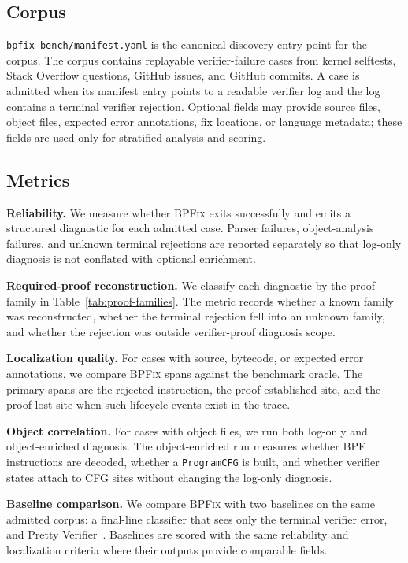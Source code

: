 \documentclass[sigplan,10pt,anonymous,review]{acmart}
\newcommand{\sys}{\textsc{BPFix}\xspace}
\begin{document}
\subsection{Corpus}
\label{sec:corpus}

\texttt{bpfix-bench/manifest.yaml} is the canonical discovery entry point for
the corpus.  The corpus contains replayable verifier-failure cases from kernel
selftests, Stack Overflow questions, GitHub issues, and GitHub commits.  A case
is admitted when its manifest entry points to a readable verifier log and the
log contains a terminal verifier rejection.  Optional fields may provide source
files, object files, expected error annotations, fix locations, or language
metadata; these fields are used only for stratified analysis and scoring.

\subsection{Metrics}
\label{sec:metrics}

\textbf{Reliability.}  We measure whether \sys exits successfully and emits a
structured diagnostic for each admitted case.  Parser failures, object-analysis
failures, and unknown terminal rejections are reported separately so that
log-only diagnosis is not conflated with optional enrichment.

\textbf{Required-proof reconstruction.}  We classify each diagnostic by the
proof family in Table~\ref{tab:proof-families}.  The metric records whether a
known family was reconstructed, whether the terminal rejection fell into an
unknown family, and whether the rejection was outside verifier-proof diagnosis
scope.

\textbf{Localization quality.}  For cases with source, bytecode, or expected
error annotations, we compare \sys spans against the benchmark oracle.  The
primary spans are the rejected instruction, the proof-established site, and the
proof-lost site when such lifecycle events exist in the trace.

\textbf{Object correlation.}  For cases with object files, we run both log-only
and object-enriched diagnosis.  The object-enriched run measures whether BPF
instructions are decoded, whether a \texttt{ProgramCFG} is built, and whether
verifier states attach to CFG sites without changing the log-only diagnosis.

\textbf{Baseline comparison.}  We compare \sys with two baselines on the same
admitted corpus: a final-line classifier that sees only the terminal verifier
error, and Pretty Verifier~\cite{prettyverifier2025}.  Baselines are scored with
the same reliability and localization criteria where their outputs provide
comparable fields.
\end{document}
